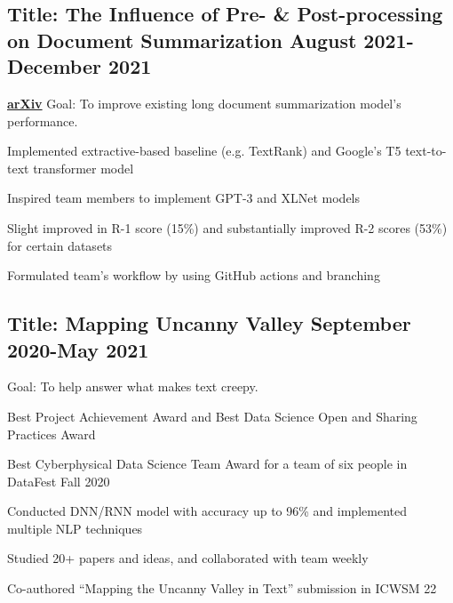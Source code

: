 \documentclass[11pt]{article}
\begin{document}
\vspace{0.1in}

\subsection*{Title: The Influence of Pre- \& Post-processing on Document Summarization \hfill {\normalfont August
        2021-December 2021}}
\noindent
\href{https://github.com/Anthonyive/csci-544-project.git}{}  \href{https://www.youtube.com/watch?v=oVIVtOPeWEs}{} \href{https://arxiv.org/abs/2112.01660}{\textbf{arXiv}} Goal: To improve existing long document summarization model's performance.
\begin{compactitem}
    \item Implemented extractive-based baseline (e.g. TextRank) and Google's T5 text-to-text transformer model
    \item Inspired team members to implement GPT-3 and XLNet models
    \item Slight improved in R-1 score (15\%) and substantially improved R-2 scores (53\%) for certain datasets
    \item Formulated team's workflow by using GitHub actions and branching
\end{compactitem}

\subsection*{Title: Mapping Uncanny Valley \hfill {\normalfont September
        2020-May 2021}}
\noindent
\href{https://github.com/Anthonyive/Research-Mapping-Uncanny-Valley.git}{} Goal: To help answer what makes text creepy.
\begin{compactitem}
    \item Best Project Achievement Award and Best Data Science Open and
    Sharing Practices Award
    \item Best Cyberphysical Data Science Team Award for a team of six people
    in DataFest Fall 2020
    \item Conducted DNN/RNN model with accuracy up to 96\% and implemented
    multiple NLP techniques
    \item Studied 20+ papers and ideas, and collaborated with team weekly
    \item Co-authored ``Mapping the Uncanny Valley in Text'' submission in
    ICWSM 22
\end{compactitem}
\end{document}
